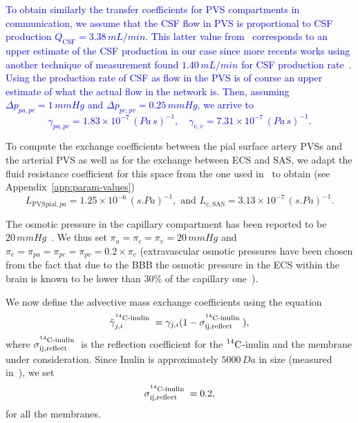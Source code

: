\documentclass[10pt]{article}
\newcommand{\1}{^{(1)}}
\newcommand{\2}{^{(2)}}
\newcommand{\abs}[1]{\left\lvert#1\right\rvert}
\newcommand{\Cinulin}{$\prescript{14}{}{\text{C}}$-inulin }
\newcommand{\corr}[1]{\textcolor{blue}{#1}}
\begin{document}
\corr{To obtain similarly the transfer coefficients for PVS compartments in communication, we assume that the CSF flow in PVS is proportional to CSF production $Q_\text{CSF} = 3.38 \,\si{mL/min}$. This latter value from~\cite{CHODOBSKI1998205} corresponds to an upper estimate of the CSF production in our case since more recents works using another technique of measurement found $1.40\,\si{mL/min}$ for CSF production rate~\cite{KARIMY201578}. Using the production rate of CSF as flow in the PVS is of course an upper estimate of what the actual flow in the network is.  Then, assuming $\Delta p_{pa,pc} = 1\,\si{mmHg}$ and $\Delta p_{pc,pv} = 0.25 \, \si{mmHg}$, we arrive to 
\[
    \gamma_{pa,pc} = 1.83 \times 10^{-7}\, \si{(Pa\,s)^{-1}},\quad \gamma_{c,v} = 7.31  \times 10^{-7}\, \si{(Pa\,s)^{-1}}.
\]
}


To compute the exchange coefficients between the pial surface artery PVSs and the arterial PVS as well as for the exchange between ECS and SAS, we adapt the fluid resistance coefficient for this space from the one used in~\cite{Vinje-2020-ICP} to obtain (see Appendix~\ref{app:param-values})
\[
    L_{\text{PVSpial},pa} =  1.25 \times 10^{-6} \, \si{(s.Pa)^{-1}},\text{ and }L_{e,\text{SAS}}  =  3.13\times 10^{-7} \,\si{(s.Pa)^{-1}}.
\]



The osmotic pressure in the capillary compartment has been reported to be $20 \, \si{mmHg}$~\cite{Levick-1991-Capillary}. We thus set $\pi_a = \pi_c = \pi_v = 20 \, \si{mmHg}$ and $\pi_e = \pi_{pa} = \pi_{pc} = \pi_{pv} = 0.2\times \pi_c$ (extravascular osmotic pressures have been chosen from the fact that due to the BBB the osmotic pressure in the ECS within the brain is known to be lower than $30\%$ of the capillary one~\cite{Levick-1991-Capillary}).



We now define the advective mass exchange coefficients using the equation
\[
    \tilde \gamma_{j,i}^{\text{\Cinulin}} = \gamma_{j,i}(1-\sigma^{\text{\Cinulin}}_\text{ij,reflect}),  
\]
where $\sigma^\text{\Cinulin}_\text{ij,reflect}$ is the reflection coefficient for the \Cinulin and the membrane under consideration.
Since Inulin is approximately $5000 \, \si{Da}$ in size (measured in~\cite{trainor1982transcapillary}), we set  
\[
    \sigma^\text{\Cinulin}_\text{ij,reflect} = 0.2,
\]
for all the membranes.
\end{document}
